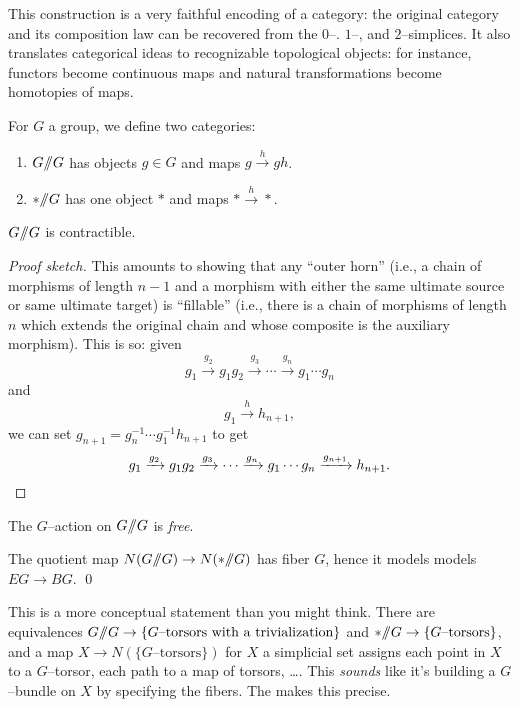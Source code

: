 \begin{remark}
This construction is a very faithful encoding of a category: the original category and its composition law can be recovered from the $0$--. $1$--, and $2$--simplices.
It also translates categorical ideas to recognizable topological objects: for instance, functors become continuous maps and natural transformations become homotopies of maps.
\end{remark}


\begin{example}
For $G$ a group, we define two categories:
\begin{enumerate}
    \item $G /\!\!/ G$ has objects $g \in G$ and maps $g \xrightarrow h gh$.
    \item $* /\!\!/ G$ has one object $*$ and maps $* \xrightarrow h *$.
\end{enumerate}
\end{example}

\begin{lemma}
$G /\!\!/ G$ is contractible.
\end{lemma}
\begin{proof}[Proof sketch]
This amounts to showing that any ``outer horn'' (i.e., a chain of morphisms of length $n-1$ and a morphism with either the same ultimate source or same ultimate target) is ``fillable'' (i.e., there is a chain of morphisms of length $n$ which extends the original chain and whose composite is the auxiliary morphism).
This is so: given \[g_1 \xrightarrow{g_2} g_1 g_2 \xrightarrow{g_3} \cdots \xrightarrow{g_n} g_1 \cdots g_n\] and \[g_1 \xrightarrow{h} h_{n+1},\] we can set $g_{n+1} = g_n^{-1} \cdots g_1^{-1} h_{n+1}$ to get \[g_1 \xrightarrow{g_2} g_1 g_2 \xrightarrow{g_3} \cdots \xrightarrow{g_n} g_1 \cdots g_n \xrightarrow{g_{n+1}} h_{n+1}. \qedhere\]
\end{proof}

\begin{remark}
The $G$--action on $G /\!\!/ G$ is \emph{free}.
\end{remark}

\begin{corollary}
The quotient map $N(G /\!\!/ G) \to N(* /\!\!/ G)$ has fiber $G$, hence it models models $EG \to BG$. \qed
\end{corollary}

\begin{remark}
This is a more conceptual statement than you might think.
There are equivalences $G /\!\!/ G \to \{\text{$G$--torsors with a trivialization}\}$ and $* /\!\!/ G \to \{\text{$G$--torsors}\}$, and a map $X \to N(\{\text{$G$--torsors}\})$ for $X$ a simplicial set assigns each point in $X$ to a $G$--torsor, each path to a map of torsors, \ldots .
This \emph{sounds} like it's building a $G$--bundle on $X$ by specifying the fibers.
The  makes this precise.
\end{remark}

